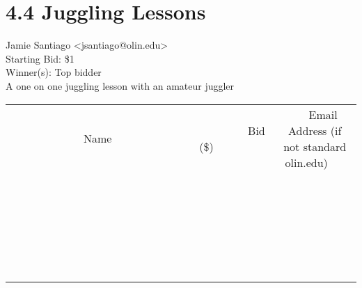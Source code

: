 \documentclass[11pt]{article}
\begin{document}
					\section*{4.4 Juggling Lessons}
					Jamie Santiago <jsantiago@olin.edu> \\
					Starting Bid: \$1 \\
					Winner(s): Top bidder \\
					A one on one juggling lesson with an amateur juggler \\
					[6ex]
					\begin{tabular}{c c c}
						~~~~~~~~~~~~~Name~~~~~~~~~~~~~ & ~~~~~~~~~Bid (\$)~~~~~~~~~ & ~~~Email Address (if not standard olin.edu)~~~ \\
				
 & & \\
\hline
 & & \\
\hline
 & & \\
\hline
 & & \\
\hline
 & & \\
\hline
 & & \\
\hline
 & & \\
\hline
 & & \\
\hline
 & & \\
\hline
 & & \\
\hline
 & & \\
\hline
 & & \\
\hline
 & & \\
\hline
 & & \\
\hline
 & & \\
\hline
 & & \\
\hline
 & & \\
\hline
 & & \\
\hline
 & & \\
\hline
 & & \\
\hline
 & & \\
\hline
 & & \\
\hline
 & & \\
\hline
 & & \\
\hline
 & & \\
\hline
 & & \\
\hline
					\end{tabular}
					\clearpage
				
\end{document}
